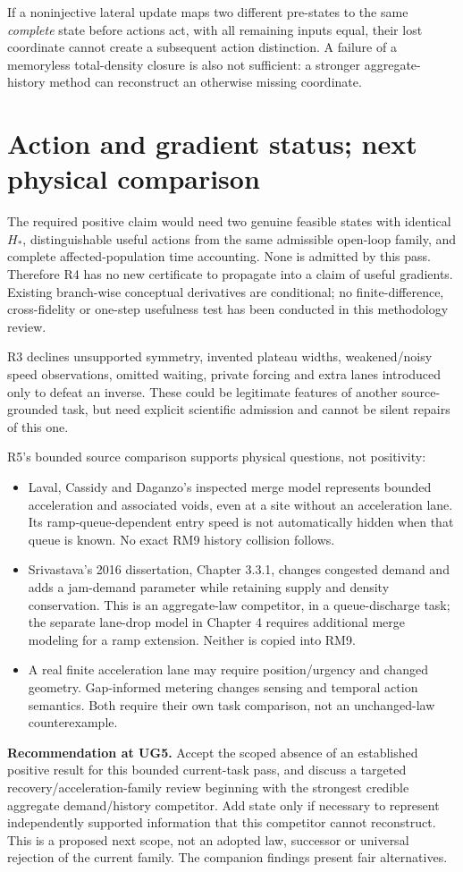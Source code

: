 \documentclass[10pt,a4paper]{article}
\begin{document}
If a noninjective lateral update maps two different pre-states to the same
\emph{complete} state before actions act, with all remaining inputs equal,
their lost coordinate cannot create a subsequent action distinction. A failure
of a memoryless total-density closure is also not sufficient: a stronger
aggregate-history method can reconstruct an otherwise missing coordinate.
\newpage

\section{Action and gradient status; next physical comparison}
The required positive claim would need two genuine feasible states with
identical $H_*$, distinguishable useful actions from the same admissible
open-loop family, and complete affected-population time accounting. None is
admitted by this pass. Therefore R4 has no new certificate to propagate into
a claim of useful gradients. Existing branch-wise conceptual derivatives are
conditional; no finite-difference, cross-fidelity or one-step usefulness test
has been conducted in this methodology review.

R3 declines unsupported symmetry, invented plateau widths, weakened/noisy
speed observations, omitted waiting, private forcing and extra lanes introduced
only to defeat an inverse. These could be legitimate features of another
source-grounded task, but need explicit scientific admission and cannot be
silent repairs of this one.

R5's bounded source comparison supports physical questions, not positivity:
\begin{itemize}
\item Laval, Cassidy and Daganzo's inspected merge model represents bounded
acceleration and associated voids, even at a site without an acceleration lane.
Its ramp-queue-dependent entry speed is not automatically hidden when that
queue is known. No exact RM9 history collision follows.
\item Srivastava's 2016 dissertation, Chapter 3.3.1, changes congested demand
and adds a jam-demand parameter while retaining supply and density
conservation. This is an aggregate-law competitor, in a queue-discharge task;
the separate lane-drop model in Chapter 4 requires additional merge modeling
for a ramp extension. Neither is copied into RM9.
\item A real finite acceleration lane may require position/urgency and changed
geometry. Gap-informed metering changes sensing and temporal action semantics.
Both require their own task comparison, not an unchanged-law counterexample.
\end{itemize}
\textbf{Recommendation at UG5.} Accept the scoped absence of an established
positive result for this bounded current-task pass, and discuss a targeted
recovery/acceleration-family review beginning with the strongest credible
aggregate demand/history competitor. Add state only if necessary to represent
independently supported information that this competitor cannot reconstruct.
This is a proposed next scope, not an adopted law, successor or universal
rejection of the current family. The companion findings present fair alternatives.
\end{document}
